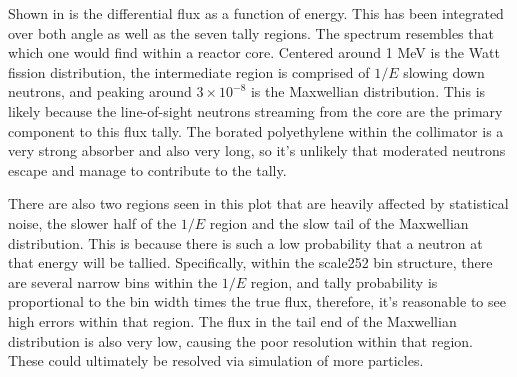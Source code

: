 Shown in  is the differential flux as a function of energy.
This has been integrated over both angle as well as the seven tally regions.
The spectrum resembles that which one would find within a reactor core.
Centered around 1 MeV is the Watt fission distribution, the intermediate region is comprised of $1/E$ slowing down neutrons, and peaking around $3 \times 10^{-8}$ is the Maxwellian distribution.
This is likely because the line-of-sight neutrons streaming from the core are the primary component to this flux tally.
The borated polyethylene within the collimator is a very strong absorber and also very long, so it's unlikely that moderated neutrons escape and manage to contribute to the tally.

There are also two regions seen in this plot that are heavily affected by statistical noise, the slower half of the $1/E$ region and the slow tail of the Maxwellian distribution.
This is because there is such a low probability that a neutron at that energy will be tallied.
Specifically, within the scale252 bin structure, there are several narrow bins within the $1/E$ region, and tally probability is proportional to the bin width times the true flux, therefore, it's reasonable to see high errors within that region.
The flux in the tail end of the Maxwellian distribution is also very low, causing the poor resolution within that region.
These could ultimately be resolved via simulation of more particles.


\clearpage

